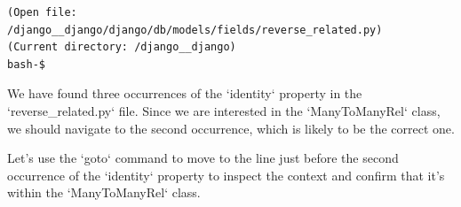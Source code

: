 {\begin{observationbox}
\begin{Verbatim}[breaklines=true, breakanywhere=true]
(Open file: /django__django/django/db/models/fields/reverse_related.py)
(Current directory: /django__django)
bash-$
\end{Verbatim}
\end{observationbox}
\begin{agentbox}
We have found three occurrences of the `identity` property in the `reverse\_related.py` file. Since we are interested in the `ManyToManyRel` class, we should navigate to the second occurrence, which is likely to be the correct one.



Let's use the `goto` command to move to the line just before the second occurrence of the `identity` property to inspect the context and confirm that it's within the `ManyToManyRel` class.




\end{agentbox}}

